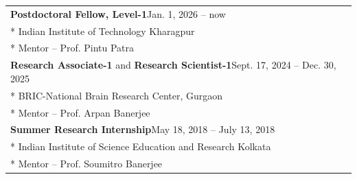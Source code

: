 
\noindent
\begin{tabular}{@{} m{}}
\textbf{Postdoctoral Fellow, Level-1}\hfill Jan. 1, 2026 -- now\\*
\textcolor{mygray2}{Indian Institute of Technology Kharagpur}\\*
\textcolor{mygray2}{Mentor -- \textcolor{mentors}{Prof. Pintu Patra}}\\[0.175cm]

\textbf{Research Associate-1} and \textbf{Research Scientist-1}\hfill Sept. 17, 2024 -- Dec. 30, 2025\\*
\textcolor{mygray2}{BRIC-National Brain Research Center, Gurgaon}\\*
\textcolor{mygray2}{Mentor -- \textcolor{mentors}{Prof. Arpan Banerjee}}\\[0.175cm]

\textbf{Summer Research Internship}\hfill May 18, 2018 -- July 13, 2018\\*
\textcolor{mygray2}{Indian Institute of Science Education and Research Kolkata}\\*
\textcolor{mygray2}{Mentor -- \textcolor{mentors}{Prof. Soumitro Banerjee}}\\[0.175cm] 
\end{tabular}


